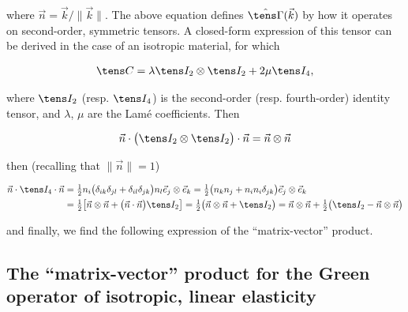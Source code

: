 \documentclass[oneside]{memoir}
\begin{document}
where \(\vec n=\vec k/\lVert\vec k\rVert\). The above equation defines \(\hat{\tens\Gamma}(\vec k)\) by how it operates on second-order, symmetric tensors. A closed-form expression of this tensor can be derived in the case of an isotropic material, for which



\begin{equation*}
\begin{split}\tens C=\lambda\tens I_2\otimes\tens I_2+2\mu\tens I_4,\end{split}\end{equation*}


where \(\tens I_2\) (resp. \(\tens I_4\)) is the second-order (resp. fourth-order) identity tensor, and \(\lambda\), \(\mu\) are the Lamé coefficients. Then



\begin{equation*}
\begin{split}\vec n\cdot\bigl(\tens I_2\otimes\tens I_2\bigr)\cdot\vec n=\vec n\otimes\vec n\end{split}\end{equation*}


then (recalling that \(\lVert\vec n\rVert=1\))



\begin{equation*}
\begin{split}\begin{aligned}
\vec n\cdot\tens I_4\cdot\vec n
&=\tfrac12 n_i\bigl(\delta_{ik}\delta_{jl}+\delta_{il}\delta_{jk}\bigr)n_l
\vec e_j\otimes\vec e_k
=\tfrac12\bigl(n_kn_j+n_in_i\delta_{jk}\bigr)\vec e_j\otimes\vec e_k\\
&=\tfrac12\bigl[\vec n\otimes\vec n+\bigl(\vec n\cdot\vec n\bigr)\tens I_2\bigr]
=\tfrac12\bigl(\vec n\otimes\vec n+\tens I_2\bigr)
=\vec n\otimes\vec n+\tfrac12\bigl(\tens I_2-\vec n\otimes\vec n\bigr)
\end{aligned}\end{split}\end{equation*}


and finally, we find the following expression of the “matrix-vector” product.



\hypertarget{17469303166468401856}{}


\subsection{The “matrix-vector” product for the Green operator of isotropic, linear elasticity}
\end{document}
